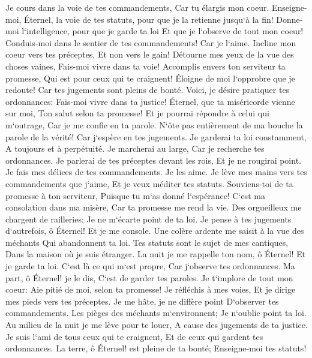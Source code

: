 \verse Je cours dans la voie de tes commandements, Car tu élargis mon coeur. 
\verse Enseigne-moi, Éternel, la voie de tes statuts, pour que je la retienne jusqu`à la fin! 
\verse Donne-moi l`intelligence, pour que je garde ta loi Et que je l`observe de tout mon coeur! 
\verse Conduis-moi dans le sentier de tes commandements! Car je l`aime. 
\verse Incline mon coeur vers tes préceptes, Et non vers le gain! 
\verse Détourne mes yeux de la vue des choses vaines, Fais-moi vivre dans ta voie! 
\verse Accomplis envers ton serviteur ta promesse, Qui est pour ceux qui te craignent! 
\verse Éloigne de moi l`opprobre que je redoute! Car tes jugements sont pleins de bonté. 
\verse Voici, je désire pratiquer tes ordonnances: Fais-moi vivre dans ta justice! 
\verse Éternel, que ta miséricorde vienne sur moi, Ton salut selon ta promesse! 
\verse Et je pourrai répondre à celui qui m`outrage, Car je me confie en ta parole. 
\verse N`ôte pas entièrement de ma bouche la parole de la vérité! Car j`espère en tes jugements. 
\verse Je garderai ta loi constamment, A toujours et à perpétuité. 
\verse Je marcherai au large, Car je recherche tes ordonnances. 
\verse Je parlerai de tes préceptes devant les rois, Et je ne rougirai point. 
\verse Je fais mes délices de tes commandements. Je les aime. 
\verse Je lève mes mains vers tes commandements que j`aime, Et je veux méditer tes statuts. 
\verse Souviens-toi de ta promesse à ton serviteur, Puisque tu m`as donné l`espérance! 
\verse C`est ma consolation dans ma misère, Car ta promesse me rend la vie. 
\verse Des orgueilleux me chargent de railleries; Je ne m`écarte point de ta loi. 
\verse Je pense à tes jugements d`autrefois, ô Éternel! Et je me console. 
\verse Une colère ardente me saisit à la vue des méchants Qui abandonnent ta loi. 
\verse Tes statuts sont le sujet de mes cantiques, Dans la maison où je suis étranger. 
\verse La nuit je me rappelle ton nom, ô Éternel! Et je garde ta loi. 
\verse C`est là ce qui m`est propre, Car j`observe tes ordonnances. 
\verse Ma part, ô Éternel! je le dis, C`est de garder tes paroles. 
\verse Je t`implore de tout mon coeur: Aie pitié de moi, selon ta promesse! 
\verse Je réfléchis à mes voies, Et je dirige mes pieds vers tes préceptes. 
\verse Je me hâte, je ne diffère point D`observer tes commandements. 
\verse Les pièges des méchants m`environnent; Je n`oublie point ta loi. 
\verse Au milieu de la nuit je me lève pour te louer, A cause des jugements de ta justice. 
\verse Je suis l`ami de tous ceux qui te craignent, Et de ceux qui gardent tes ordonnances. 
\verse La terre, ô Éternel! est pleine de ta bonté; Enseigne-moi tes statuts! 
